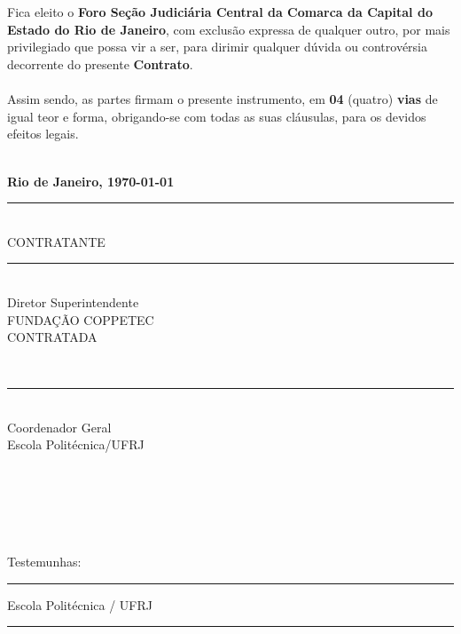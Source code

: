 \documentclass[a4paper,7.5pt]{article}
\begin{document}
\\\\
\indent Fica eleito o {\bf Foro Seção Judiciária Central da Comarca da Capital do Estado do Rio de Janeiro}, com exclusão expressa de qualquer outro, por mais privilegiado que possa vir a ser, para dirimir qualquer dúvida ou controvérsia decorrente do presente {\bf Contrato}.
\\\\
\indent Assim sendo, as partes firmam o presente instrumento, em {\bf 04} (quatro) {\bf vias} de igual teor e forma, obrigando-se com todas as suas cláusulas, para os devidos efeitos legais.
\\\\
\begin{flushright}
	{\bf Rio de Janeiro, \today}
\end{flushright}
\noindent
\parbox{7.5cm}{    	
	\fontsize{7.5}{9}\selectfont
	\vspace{-0.2cm}
	\hrule
	\\
	CONTRATANTE
}
\indent\indent\indent\indent
\parbox{7.5cm}{    	
	\fontsize{7.5}{9}\selectfont
	\vspace{0.5cm}
	\hrule
	\\
	Diretor Superintendente
	\\
	FUNDAÇÃO COPPETEC
	\\
	CONTRATADA
}
\\
\parbox{7.5cm}{    	
	\fontsize{7.5}{9}\selectfont
	\vspace{0.5cm}
	\hrule
	\\
	Coordenador Geral
	\\
	Escola Politécnica/UFRJ
}
\\\\\\\\\\
Testemunhas:
\\
\parbox{7.5cm}{    	
	\fontsize{7.5}{9}\selectfont
	\vspace{1.7cm}
	\hrule
	\centering {}
	Escola Politécnica / UFRJ	
}
\indent\indent\indent\indent
\parbox{7.5cm}{    	
	\fontsize{7.5}{11}\selectfont
	\vspace{1.5cm}
	\hrule
}
\end{document}
